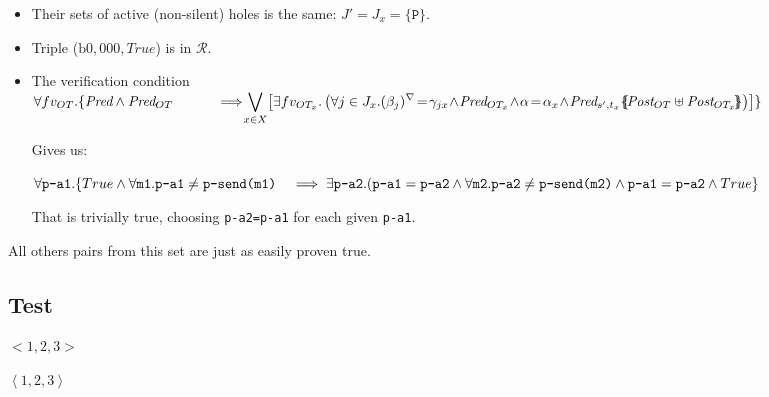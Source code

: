 \documentclass{lmcs}
\newcommand{\nounderline}[1]{#1}
\begin{document}
\begin{itemize}
  \item Their sets of active (non-silent) holes is the same: $J' = J_x = \{\texttt{P}\}$.
  \item Triple ($\text{b0},  000,  True$) is in $\mathcal{R}$.
  \item The verification condition \\
    $\forall fv_{OT}. \{ \Pred \land \Pred_{OT}\\
\hspace{1cm} \implies\!\!\! \displaystyle{\bigvee_{x\in X}\!
   \left[\exists fv_{OT_x}.
  \left( \forall j\in J_x. \vis{\beta_j}\!=\!\gamma_{jx}\! \land\! \Pred_{OT_x}
     \!\land\! \alpha\!=\!\alpha_x\! \land\!  
     \Pred_{s',t_x}\subst{\Post_{OT}\uplus\Post_{OT_x}}\right)\right]\}}$

\medskip Gives us:

$\forall \texttt{p-a1}. \{True \land \forall \texttt{m1}. \texttt{p-a1} \neq \texttt{p-send(m1)}\\
 \hspace{3mm} \implies \exists \texttt{p-a2}. 
(\texttt{p-a1} = \texttt{p-a2}
\land \forall \texttt{m2}. \texttt{p-a2} \neq \texttt{p-send(m2)}
\land \nounderline{\texttt{p-a1}} = \nounderline{\texttt{p-a2}} 
\land True\}$

\medskip That is trivially true, choosing \texttt{p-a2=p-a1} for each given \texttt{p-a1}.

\end{itemize}

  \bigskip
  All others pairs from this set are just as easily proven true.

  \subsection{Test}

  $<1,2,3>$

  $\left< 1,2,3 \right>$

         
\end{document}
